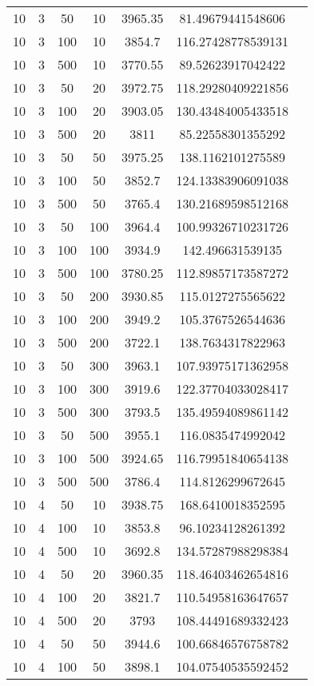 {\begin{longtabu}{S
S
S
S
S
S[round-mode=places, round-precision=0]
S[round-mode=places, round-precision=0]}
10 & 3 & 50 & 10 & 3965.35 & 81.49679441548606 \\
10 & 3 & 100 & 10 & 3854.7 & 116.27428778539131 \\
10 & 3 & 500 & 10 & 3770.55 & 89.52623917042422 \\
10 & 3 & 50 & 20 & 3972.75 & 118.29280409221856 \\
10 & 3 & 100 & 20 & 3903.05 & 130.43484005433518 \\
10 & 3 & 500 & 20 & 3811 & 85.22558301355292 \\
10 & 3 & 50 & 50 & 3975.25 & 138.1162101275589 \\
10 & 3 & 100 & 50 & 3852.7 & 124.13383906091038 \\
10 & 3 & 500 & 50 & 3765.4 & 130.21689598512168 \\
10 & 3 & 50 & 100 & 3964.4 & 100.99326710231726 \\
10 & 3 & 100 & 100 & 3934.9 & 142.496631539135 \\
10 & 3 & 500 & 100 & 3780.25 & 112.89857173587272 \\
10 & 3 & 50 & 200 & 3930.85 & 115.0127275565622 \\
10 & 3 & 100 & 200 & 3949.2 & 105.3767526544636 \\
10 & 3 & 500 & 200 & 3722.1 & 138.7634317822963 \\
10 & 3 & 50 & 300 & 3963.1 & 107.93975171362958 \\
10 & 3 & 100 & 300 & 3919.6 & 122.37704033028417 \\
10 & 3 & 500 & 300 & 3793.5 & 135.49594089861142 \\
10 & 3 & 50 & 500 & 3955.1 & 116.0835474992042 \\
10 & 3 & 100 & 500 & 3924.65 & 116.79951840654138 \\
10 & 3 & 500 & 500 & 3786.4 & 114.8126299672645 \\
10 & 4 & 50 & 10 & 3938.75 & 168.6410018352595 \\
10 & 4 & 100 & 10 & 3853.8 & 96.10234128261392 \\
10 & 4 & 500 & 10 & 3692.8 & 134.57287988298384 \\
10 & 4 & 50 & 20 & 3960.35 & 118.46403462654816 \\
10 & 4 & 100 & 20 & 3821.7 & 110.54958163647657 \\
10 & 4 & 500 & 20 & 3793 & 108.44491689332423 \\
10 & 4 & 50 & 50 & 3944.6 & 100.66846576758782 \\
10 & 4 & 100 & 50 & 3898.1 & 104.07540535592452 \\

\end{longtabu}}
